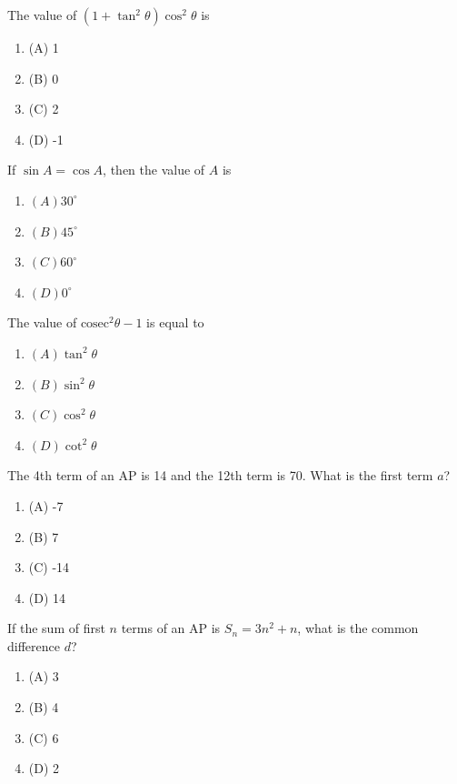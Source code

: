 \documentclass[12pt,a4paper]{exam}
\begin{document}
\begin{questions}
\question[1] The value of $(1 + \tan^2 \theta) \cos^2 \theta$ is
\begin{enumerate}[label=(\Alph*)]
  \item (A) 1
  \item (B) 0
  \item (C) 2
  \item (D) -1
\end{enumerate}
\vspace{0.15cm}

\question[1] If $\sin A = \cos A$, then the value of $A$ is
\begin{enumerate}[label=(\Alph*)]
  \item $(A) 30^\circ$
  \item $(B) 45^\circ$
  \item $(C) 60^\circ$
  \item $(D) 0^\circ$
\end{enumerate}
\vspace{0.15cm}

\question[1] The value of $\text{cosec}^2 \theta - 1$ is equal to
\begin{enumerate}[label=(\Alph*)]
  \item $(A) \tan^2 \theta$
  \item $(B) \sin^2 \theta$
  \item $(C) \cos^2 \theta$
  \item $(D) \cot^2 \theta$
\end{enumerate}
\vspace{0.15cm}

\question[1] The 4th term of an AP is 14 and the 12th term is 70. What is the first term $a$?
\begin{enumerate}[label=(\Alph*)]
  \item (A) -7
  \item (B) 7
  \item (C) -14
  \item (D) 14
\end{enumerate}
\vspace{0.15cm}

\question[1] If the sum of first $n$ terms of an AP is $S_n = 3n^2 + n$, what is the common difference $d$?
\begin{enumerate}[label=(\Alph*)]
  \item (A) 3
  \item (B) 4
  \item (C) 6
  \item (D) 2
\end{enumerate}
\vspace{0.15cm}


\end{questions}
\end{document}
